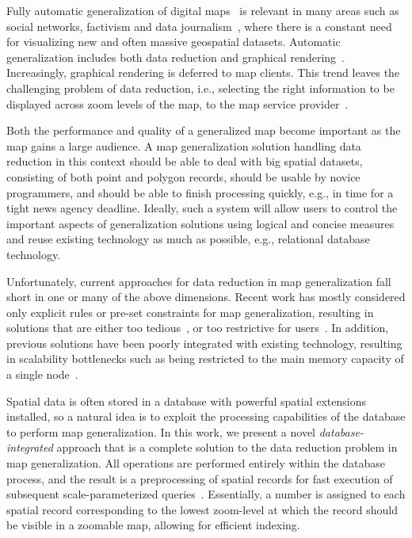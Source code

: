 \documentclass[11pt, oneside]{report}
\begin{document}
{Fully automatic generalization of digital maps~\cite{sarma2012fusiontables,nutanong2012multiresolution} is relevant in many areas such as social networks, factivism and data journalism~\cite{cohen2011journalism,bono,sankaranarayanan2009twitterstand}, where there is a constant need for visualizing new and often massive geospatial datasets. Automatic generalization includes both data reduction and graphical rendering~\cite{weibel1999generalising,gruenreich1985cag}. Increasingly, graphical rendering is deferred to map clients. This trend leaves the challenging problem of data reduction, i.e., selecting the right information to be displayed across zoom levels of the map, to the map service provider~\cite{gaffuri12vectortiles}. 

Both the performance and quality of a generalized map become important as the map gains a large audience. A map generalization solution handling data reduction in this context should be able to deal with big spatial datasets, consisting of both point and polygon records, should be usable by novice programmers, and should be able to finish processing quickly, e.g., in time for a tight news agency deadline. Ideally, such a system will allow users to control the important aspects of generalization solutions using logical and concise measures and reuse existing technology as much as possible, e.g., relational database technology.

Unfortunately, current approaches for data reduction in map generalization fall short in one or many of the above dimensions. Recent work has mostly considered only explicit rules or pre-set constraints for map generalization, resulting in solutions that are either too tedious~\cite{sld,mapnik}, or too restrictive for users~\cite{sarma2012fusiontables,nutanong2012multiresolution}. In addition, previous solutions have been poorly integrated with existing technology, resulting in scalability bottlenecks such as being restricted to the main memory capacity of a single node~\cite{sarma2012fusiontables}. 
 

Spatial data is often stored in a database with powerful spatial extensions installed, so a natural idea is to exploit the processing capabilities of the database to perform map generalization. In this work, we present a novel \emph{database-integrated} approach that is a complete solution to the data reduction problem in map generalization. All operations are performed entirely within the database process, and the result is a preprocessing of spatial records for fast execution of subsequent scale-parameterized queries~\cite{hilbert1891ueber}. Essentially, a number is assigned to each spatial record corresponding to the lowest zoom-level at which the record should be visible in a zoomable map, allowing for efficient indexing.

}
\end{document}
